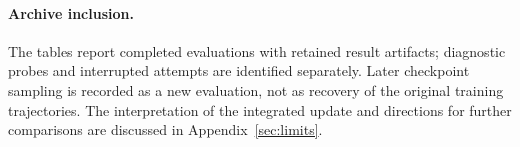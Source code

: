 \paragraph{Archive inclusion.}
The tables report completed evaluations with retained result artifacts; diagnostic probes and interrupted attempts are identified separately. Later checkpoint sampling is recorded as a new evaluation, not as recovery of the original training trajectories. The interpretation of the integrated update and directions for further comparisons are discussed in Appendix~\ref{sec:limits}.

